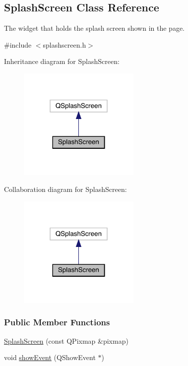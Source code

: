 \hypertarget{classSplashScreen}{}\subsection{Splash\+Screen Class Reference}
\label{classSplashScreen}


The widget that holds the splash screen shown in the page.  




{\ttfamily \#include $<$splashscreen.\+h$>$}



Inheritance diagram for Splash\+Screen\+:\nopagebreak
\begin{figure}[H]
\begin{center}
\leavevmode
\includegraphics[width=166pt]{classSplashScreen__inherit__graph}
\end{center}
\end{figure}


Collaboration diagram for Splash\+Screen\+:\nopagebreak
\begin{figure}[H]
\begin{center}
\leavevmode
\includegraphics[width=166pt]{classSplashScreen__coll__graph}
\end{center}
\end{figure}
\subsubsection*{Public Member Functions}
\begin{DoxyCompactItemize}
\item 
\mbox{\hyperlink{classSplashScreen_a25b099ed5f03150091a21ba6fd83fa39}{Splash\+Screen}} (const Q\+Pixmap \&pixmap)
\item 
void \mbox{\hyperlink{classSplashScreen_a1fb8a268c53bc5de2ba37df68cc237cc}{show\+Event}} (Q\+Show\+Event $\ast$)
\end{DoxyCompactItemize}
